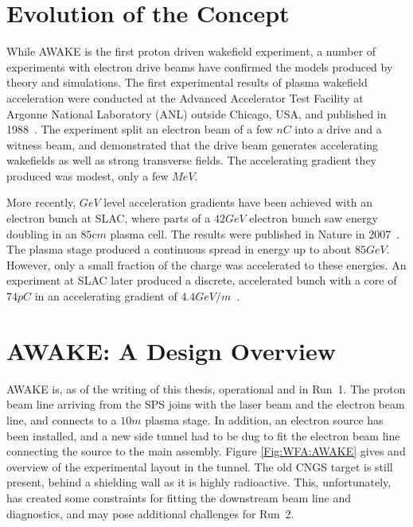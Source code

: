 \section{Evolution of the Concept}
\label{WFA:History}

While AWAKE is the first proton driven wakefield experiment, a number of experiments with electron drive beams have confirmed the models produced by theory and simulations.
The first experimental results of plasma wakefield acceleration were conducted at the Advanced Accelerator Test Facility at Argonne National Laboratory (ANL) outside Chicago, USA, and published in 1988~\cite{rosenzweig:1988}.
The experiment split an electron beam of a few $\unit{nC}$ into a drive and a witness beam, and demonstrated that the drive beam generates accelerating wakefields as well as strong transverse fields. The accelerating gradient they produced was modest, only a few $\unit{MeV}$.

More recently, $\unit{GeV}$ level acceleration gradients have been achieved with an electron bunch at SLAC, where parts of a $42\unit{GeV}$ electron bunch saw energy doubling in an $85\unit{cm}$ plasma cell.
The results were published in Nature in 2007~\cite{blumenfeld:2007}. The plasma stage produced a continuous spread in energy up to about $85\unit{GeV}$.
However, only a small fraction of the charge was accelerated to these energies.
An experiment at SLAC later produced a discrete, accelerated bunch with a core of $74\unit{pC}$ in an accelerating gradient of $4.4\unit{GeV/m}$~\cite{litos:2014}.


\section{AWAKE: A Design Overview}
\label{WFA:Design}

AWAKE is, as of the writing of this thesis, operational and in Run~1.
The proton beam line arriving from the SPS joins with the laser beam and the electron beam line, and connects to a $10\unit{m}$ plasma stage.
In addition, an electron source has been installed, and a new side tunnel had to be dug to fit the electron beam line connecting the source to the main assembly.
Figure \ref{Fig:WFA:AWAKE} gives and overview of the experimental layout in the tunnel.
The old CNGS target is still present, behind a shielding wall as it is highly radioactive.
This, unfortunately, has created some constraints for fitting the downstream beam line and diagnostics, and may pose additional challenges for Run~2.

